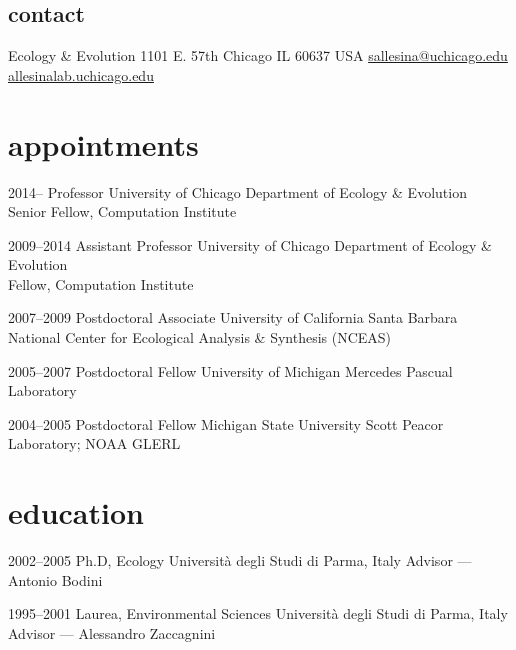 \documentclass[]{friggeri-cv} %
\begin{document}


\begin{aside} %
\section{contact}
Ecology \& Evolution
1101 E. 57th Chicago
IL 60637 USA
\href{mailto:sallesina@uchicago.edu}{sallesina@uchicago.edu}
\href{http://allesinalab.uchicago.edu}{allesinalab.uchicago.edu}
\end{aside}

\section{appointments}
\begin{entrylist}
\entry
{2014--}
{Professor}
{University of Chicago}
{Department of Ecology \& Evolution\\
Senior Fellow, Computation Institute}

\entry
{2009--2014}
{Assistant Professor}
{University of Chicago}
{Department of Ecology \& Evolution\\
Fellow, Computation Institute}

\entry
{2007--2009}
{Postdoctoral Associate}
{University of California Santa Barbara}
{National Center for Ecological Analysis \& Synthesis (NCEAS)}

\entry
{2005--2007}
{Postdoctoral Fellow}
{University of Michigan}
{Mercedes Pascual Laboratory}

\entry
{2004--2005}
{Postdoctoral Fellow}
{Michigan State University}
{Scott Peacor Laboratory; NOAA GLERL}
\end{entrylist}


\section{education}
\begin{entrylist}
\entry
{2002--2005}
{Ph.D, Ecology}
{Universit\`a degli Studi di Parma, Italy}
{Advisor --- Antonio Bodini}


\entry
{1995--2001}
{Laurea, Environmental Sciences}
{Universit\`a degli Studi di Parma, Italy}
{Advisor --- Alessandro Zaccagnini}

\end{entrylist}
\end{document}
